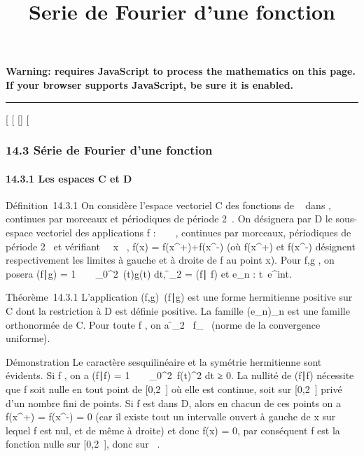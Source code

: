 \documentclass[]{article}
\title{Serie de Fourier d'une fonction}
\author{}
\date{}
\begin{document}
\maketitle

\textbf{Warning: 
requires JavaScript to process the mathematics on this page.\\ If your
browser supports JavaScript, be sure it is enabled.}

\begin{center}\rule{3in}{0.4pt}\end{center}

[
[
[]
[

\subsubsection{14.3 Série de Fourier d'une fonction}

\paragraph{14.3.1 Les espaces C et D}

Définition~14.3.1 On considère l'espace vectoriel C des fonctions de ~
dans , continues par morceaux et périodiques de période 2\pi~. On
désignera par D le sous-espace vectoriel des applications f : ~ \rightarrow~ ,
continues par morceaux, périodiques de période 2\pi~ et vérifiant
\forall~~x \in {}~, f(x) =
f(x^+)+f(x^-)  (où
f(x^+) et f(x^-) désignent respectivement les
limites à gauche et à droite de f au point x). Pour f,g \inC, on posera
(f∣g) = 1 \pi~
\int ~
_0^2\pi~\overlinef(t)g(t) dt,
\f_2 =
\sqrt(f∣ f) et
e_n : t\mapsto~e^int.

Théorème~14.3.1 L'application
(f,g)\mapsto~(f\mathrel∣g) est
une forme hermitienne positive sur C dont la restriction à D est définie
positive. La famille (e_n)_n\in{} est une famille
orthonormée de C. Pour toute f \inC, on a
\f_2
\leq\ f_\infty~
(norme de la convergence uniforme).

Démonstration Le caractère sesquilinéaire et la symétrie hermitienne
sont évidents. Si f \inC, on a (f∣f) = 1
\pi~ \int ~
_0^2\pi~f(t)^2 dt ≥ 0. La
nullité de (f∣f) nécessite que f soit nulle
en tout point de [0,2\pi~] où elle est continue, soit sur [0,2\pi~]
privé d'un nombre fini de points. Si f est dans D, alors en chacun de
ces points on a f(x^+) = f(x^-) = 0 (car il existe
tout un intervalle ouvert à gauche de x sur lequel f est nul, et de même
à droite) et donc f(x) = 0, par conséquent f est la fonction nulle sur
[0,2\pi~], donc sur ~.
\end{document}
